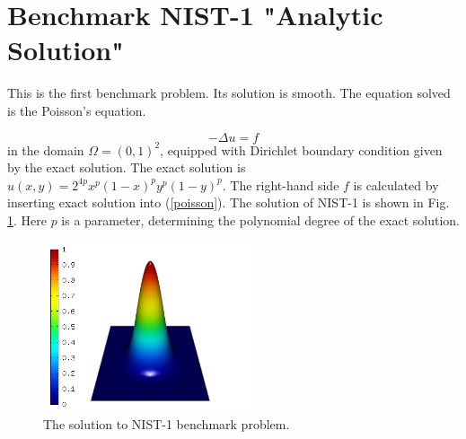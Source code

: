 \documentclass[12pt]{elsarticle}
\begin{document}

\section{Benchmark NIST-1 "Analytic Solution"}
\label{sec:bench-1}

This is the first benchmark problem. Its solution is smooth.
The equation solved is the Poisson's equation.

\begin{equation} \label{poisson}
-\Delta u = f
\end{equation}
in the domain $\Omega = (0, 1)^2$, equipped with Dirichlet
boundary condition given by the exact solution.
The exact solution is $u(x, y) = 2^{4p}x^{p}(1-x)^{p}y^{p}(1-y)^{p}$.
The right-hand side $f$ is calculated by inserting exact solution into (\ref{poisson}).
The solution of NIST-1 is shown in Fig. \ref{fig:sln-nist01}.
Here $p$ is a parameter, determining the polynomial degree of the exact solution.

\begin{figure}[!ht]
\centering
\includegraphics[height=5cm]{nist/nist-1/solution.png}
\caption{The solution to NIST-1 benchmark problem.}
\label{fig:sln-nist01}
\end{figure}
\end{document}
